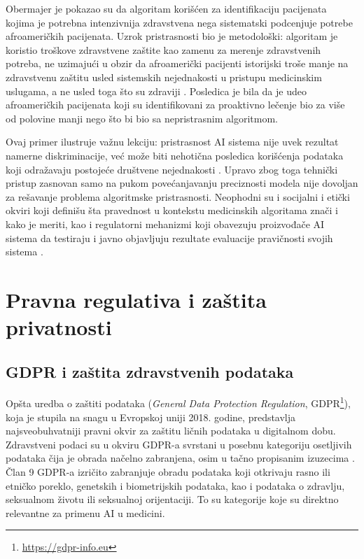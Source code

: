 \documentclass[12pt]{article}
\begin{document}
Obermajer je pokazao su da algoritam korišćen za identifikaciju pacijenata kojima je potrebna intenzivnija zdravstvena nega sistematski podcenjuje potrebe afroameričkih pacijenata. Uzrok pristrasnosti bio je metodološki: algoritam je koristio troškove zdravstvene zaštite kao zamenu za merenje zdravstvenih potreba, ne uzimajući u obzir da afroamerički pacijenti istorijski troše manje na zdravstvenu zaštitu usled sistemskih nejednakosti u pristupu 
medicinskim uslugama, a ne usled toga što su zdraviji \cite{obermeyer2019}. 
Posledica je bila da je udeo afroameričkih pacijenata koji su identifikovani za proaktivno lečenje bio za više od polovine manji nego što bi bio sa nepristrasnim algoritmom.
 
Ovaj primer ilustruje važnu lekciju: pristrasnost AI sistema nije uvek rezultat namerne diskriminacije, već može biti nehotična posledica korišćenja podataka koji odražavaju postojeće društvene nejednakosti \cite{murdoch2021}. Upravo zbog toga tehnički pristup zasnovan samo na pukom povećanjavanju preciznosti modela nije dovoljan za rešavanje problema algoritmske pristrasnosti. Neophodni su i socijalni i etički 
okviri koji definišu šta pravednost u kontekstu medicinskih algoritama znači i kako je meriti, kao i regulatorni mehanizmi koji obavezuju proizvođače AI sistema da testiraju i javno objavljuju rezultate evaluacije pravičnosti svojih sistema 
\cite{kumar2025}.
 
\newpage
\section{Pravna regulativa i zaštita privatnosti}
\subsection{GDPR i zaštita zdravstvenih podataka}
Opšta uredba o zaštiti podataka (\textit{General Data Protection Regulation}, GDPR\footnote{\url{https://gdpr-info.eu}}), koja je stupila na snagu u Evropskoj uniji 2018. godine, predstavlja najsveobuhvatniji pravni okvir za zaštitu ličnih podataka u digitalnom dobu. Zdravstveni podaci su u okviru GDPR-a svrstani u posebnu kategoriju osetljivih podataka čija je obrada načelno zabranjena, osim u tačno propisanim izuzecima \cite{gdpr2016}. Član 9 GDPR-a izričito zabranjuje obradu podataka koji otkrivaju rasno ili etničko poreklo, genetskih i biometrijskih podataka, kao i podataka o 
zdravlju, seksualnom životu ili seksualnoj orijentaciji. To su kategorije koje su direktno relevantne za primenu AI u medicini.
 
\end{document}
